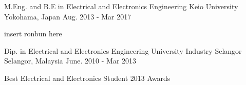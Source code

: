 

\begin{cventries}

  \cventry
    {M.Eng. and B.E in Electrical and Electronics Engineering} %
    {Keio University} %
    {Yokohama, Japan} %
    {Aug. 2013 - Mar 2017} %
    {
      \begin{cvitems} %
        \item {insert ronbun here}
      \end{cvitems}
    }

  \cventry
    {Dip. in Electrical and Electronics Engineering} %
    {University Industry Selangor} %
    {Selangor, Malaysia} %
    {June. 2010 - Mar 2013} %
    {
      \begin{cvitems} %
        \item {Best Electrical and Electronics Student 2013 Awards}
      \end{cvitems}
    }

\end{cventries}
